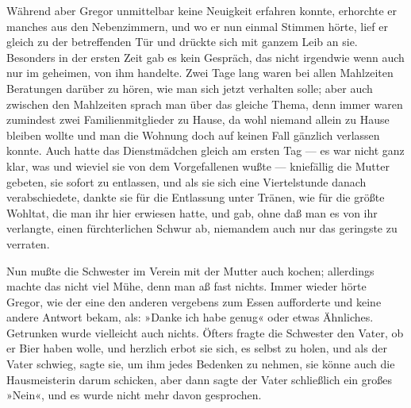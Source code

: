 Während aber Gregor unmittelbar keine Neuigkeit erfahren konnte,
erhorchte er manches aus den Nebenzimmern, und wo er nun einmal Stimmen
hörte, lief er gleich zu der betreffenden Tür und drückte sich mit
ganzem Leib an sie. Besonders in der ersten Zeit gab es kein Gespräch,
das nicht irgendwie wenn auch nur im geheimen, von ihm handelte. Zwei
Tage lang waren bei allen Mahlzeiten Beratungen darüber zu hören, wie
man sich jetzt verhalten solle; aber auch zwischen den Mahlzeiten sprach
man über das gleiche Thema, denn immer waren zumindest zwei
Familienmitglieder zu Hause, da wohl niemand allein zu Hause bleiben
wollte und man die Wohnung doch auf keinen Fall gänzlich verlassen
konnte. Auch hatte das Dienstmädchen gleich am ersten Tag --- es war
nicht ganz klar, was und wieviel sie von dem Vorgefallenen wußte ---
kniefällig die Mutter gebeten, sie sofort zu entlassen, und als sie sich
eine Viertelstunde danach verabschiedete, dankte sie für die Entlassung
unter Tränen, wie für die größte Wohltat, die man ihr hier erwiesen
hatte, und gab, ohne daß man es von ihr verlangte, einen fürchterlichen
Schwur ab, niemandem auch nur das geringste zu verraten.

Nun mußte die Schwester im Verein mit der Mutter auch kochen; allerdings
machte das nicht viel Mühe, denn man aß fast nichts. Immer wieder hörte
Gregor, wie der eine den anderen vergebens zum Essen aufforderte und
keine andere Antwort bekam, als: »Danke ich habe genug« oder etwas
Ähnliches. Getrunken wurde vielleicht auch nichts. Öfters fragte die
Schwester den Vater, ob er Bier haben wolle, und herzlich erbot sie
sich, es selbst zu holen, und als der Vater schwieg, sagte sie, um ihm
jedes Bedenken zu nehmen, sie könne auch die Hausmeisterin darum
schicken, aber dann sagte der Vater schließlich ein großes »Nein«, und
es wurde nicht mehr davon gesprochen.

